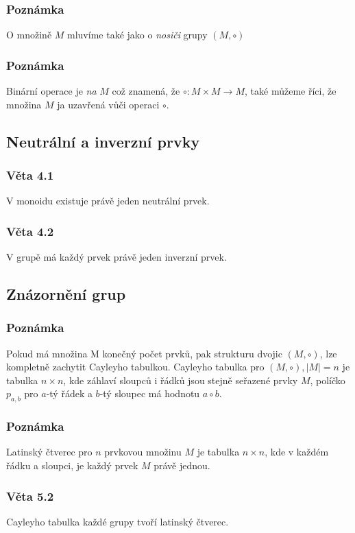 \documentclass[12pt, letterpaper]{article}
\begin{document}
\subsubsection*{Poznámka}
O množině $M$ mluvíme také jako o \textit{nosiči} grupy $(M, \circ)$

\subsubsection*{Poznámka}
Binární operace je \textit{na} $M$ což znamená, že $\circ: M \times M \to M$,
také můžeme říci, že množina $M$ ja uzavřená vůči operaci $\circ$.

\subsection{Neutrální a inverzní prvky}

\subsubsection*{Věta 4.1}
V monoidu existuje právě jeden neutrální prvek.

\subsubsection*{Věta 4.2}
V grupě má každý prvek právě jeden inverzní prvek.

\subsection{Znázornění grup}

\subsubsection*{Poznámka}
Pokud má množina M konečný počet prvků, pak strukturu dvojic $(M, \circ)$,
lze kompletně zachytit Cayleyho tabulkou. Cayleyho tabulka pro $(M, \circ), |M|=n$
je tabulka $n \times n$, kde záhlaví sloupců i řádků jsou stejně seřazené prvky $M$,
políčko $p_{a,b}$ pro $a$-tý řádek a $b$-tý sloupec má hodnotu $a \circ b$.

\subsubsection*{Poznámka}
Latinský čtverec pro $n$ prvkovou množinu $M$ je tabulka $n \times n$,
kde v každém řádku a sloupci, je každý prvek $M$ právě jednou.

\subsubsection*{Věta 5.2}
Cayleyho tabulka každé grupy tvoří latinský čtverec.
\end{document}
